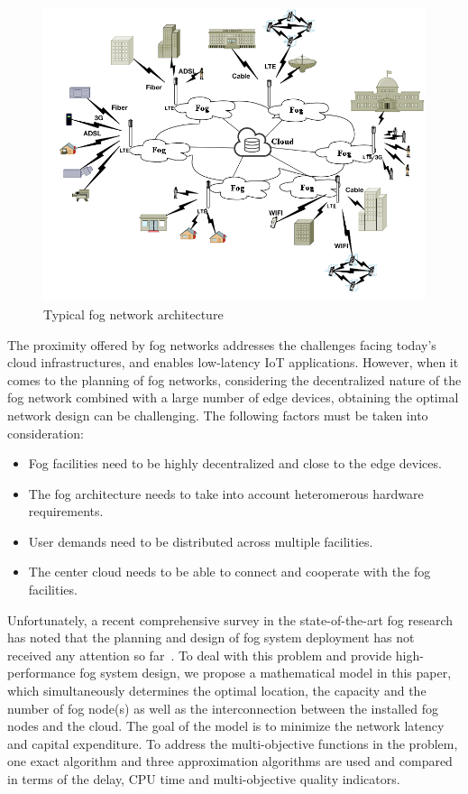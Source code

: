 \documentclass[10pt,journal,compsoc]{IEEEtran}
\begin{document}
\begin{figure}[ht]
\centerline{\includegraphics[width=\columnwidth]{fog-g.png}}
\caption{Typical fog network architecture} 
\label{foggg}
\end{figure}
 
The proximity offered by fog networks addresses the challenges facing today's cloud infrastructures, and enables low-latency IoT applications. However, when it comes to the planning of fog networks, considering the decentralized nature of the fog network combined with a large number of edge devices, obtaining the optimal network design can be challenging. The following factors must be taken into consideration:
\begin{itemize}
\item Fog facilities need to be highly decentralized and close to the edge devices.
\item The fog architecture needs to take into account heteromerous hardware requirements.
\item User demands need to be distributed across multiple facilities.
\item The center cloud needs to be able to connect and cooperate with the fog facilities.
\end{itemize}

Unfortunately, a recent comprehensive survey in the state-of-the-art fog research has noted that the planning and design of fog system deployment has not received any attention so far~\cite{mouradian2017comprehensive}. To deal with this problem and provide high-performance fog system design, we propose a mathematical model in this paper, which simultaneously determines the optimal location, the capacity and the number of fog node(s) as well as the interconnection between the installed fog nodes and the cloud. The goal of the model is to minimize the network latency and capital expenditure. To address the multi-objective functions in the problem, one exact algorithm and three approximation algorithms are used and compared in terms of the delay, CPU time and multi-objective quality indicators. 
\end{document}
